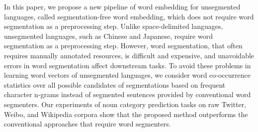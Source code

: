 In this paper, we propose a new pipeline of word embedding for unsegmented languages, called segmentation-free word embedding, which does not require word segmentation as a preprocessing step. Unlike space-delimited languages, unsegmented languages, such as Chinese and Japanese, require word segmentation as a preprocessing step. However, word segmentation, that often requires manually annotated resources, is difficult and expensive, and unavoidable errors in word segmentation affect downstream tasks. To avoid these problems in learning word vectors of unsegmented languages, we consider word co-occurrence statistics over all possible candidates of segmentations based on frequent character n-grams instead of segmented sentences provided by conventional word segmenters. Our experiments of noun category prediction tasks on raw Twitter, Weibo, and Wikipedia corpora show that the proposed method outperforms the conventional approaches that require word segmenters.
